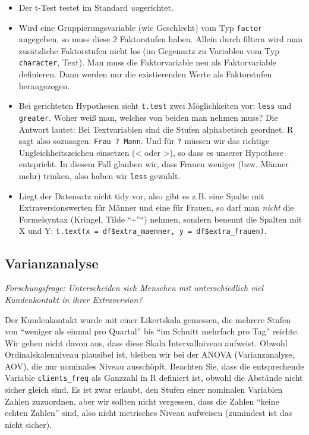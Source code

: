 \documentclass[12pt,ngerman,]{book}
\providecommand{\tightlist}{%
  \setlength{\itemsep}{0pt}\setlength{\parskip}{0pt}}
\theoremstyle{definition}
\theoremstyle{definition}
\theoremstyle{remark}
\begin{document}
\begin{itemize}
\tightlist
\item
  Der t-Test testet im Standard \emph{un}gerichtet.
\item
  Wird eine Gruppierungsvariable (wie Geschlecht) vom Typ
  \texttt{factor} angegeben, so muss diese 2 Faktorstufen haben. Allein
  durch filtern wird man zusätzliche Faktorstufen nicht los (im
  Gegensatz zu Variablen vom Typ \texttt{character}, Text). Man muss die
  Faktorvariable neu als Faktorvariable definieren. Dann werden nur die
  existierenden Werte als Faktorstufen herangezogen.
\item
  Bei gerichteten Hypothesen sieht \texttt{t.test} zwei Möglichkeiten
  vor: \texttt{less} und \texttt{greater}. Woher weiß man, welches von
  beiden man nehmen muss? Die Antwort lautet: Bei Textvariablen sind die
  Stufen alphabetisch geordnet. R sagt also sozusagen:
  \texttt{Frau\ ?\ Mann}. Und für \texttt{?} müssen wir das richtige
  Ungleichheitszeichen einsetzen (\textless{} oder \textgreater{}), so
  dass es unserer Hypothese entspricht. In diesem Fall glauben wir, dass
  Frauen weniger (bzw. Männer mehr) trinken, also haben wir
  \texttt{less} gewählt.
\item
  Liegt der Datensatz nicht tidy vor, also gibt es z.B. eine Spalte mit
  Extraversionswerten für Männer und eine für Frauen, so darf man
  \emph{nicht} die Formelsyntax (Kringel, Tilde ``\textasciitilde{}''``)
  nehmen, sondern benennt die Spalten mit X und Y:
  \texttt{t.text(x\ =\ df\$extra\_maenner,\ y\ =\ df\$extra\_frauen)}.
\end{itemize}

\subsection{Varianzanalyse}\label{varianzanalyse}

\emph{Forschungsfrage: Unterscheiden sich Menschen mit unterschiedlich
viel Kundenkontakt in ihrer Extraversion?}

Der Kundenkontakt wurde mit einer Likertskala gemessen, die mehrere
Stufen von ``weniger als einmal pro Quartal'' bis ``im Schnitt mehrfach
pro Tag'' reichte. Wir gehen nicht davon aus, dass diese Skala
Intervallniveau aufweist. Obwohl Ordinalskalenniveau plausibel ist,
bleiben wir bei der ANOVA (Varianzanalyse, AOV), die nur nominales
Niveau ausschöpft. Beachten Sie, dass die entsprechende Variable
\texttt{clients\_freq} als Ganzzahl in R definiert ist, obwohl die
Abstände nicht sicher gleich sind. Es ist zwar erlaubt, den Stufen einer
nominalen Variablen Zahlen zuzuordnen, aber wir sollten nicht vergessen,
dass die Zahlen ``keine echten Zahlen'' sind, also nicht metrisches
Niveau aufweisen (zumindest ist das nicht sicher).
\end{document}
